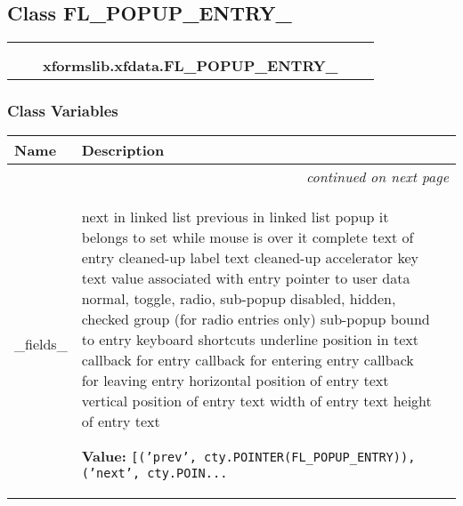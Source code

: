 
\subsection{Class FL\_POPUP\_ENTRY\_}

    \label{xformslib:xfdata:FL_POPUP_ENTRY_}
\begin{tabular}{cccccc}
\multicolumn{2}{r}{\settowidth{\BCL}{ctypes.Structure}\multirow{2}{\BCL}{ctypes.Structure}}
&&
  \\\cline{3-3}
  &&\multicolumn{1}{c|}{}
&&
  \\
&&\multicolumn{2}{l}{\textbf{xformslib.xfdata.FL\_POPUP\_ENTRY\_}}
\end{tabular}



  \subsubsection{Class Variables}

    \vspace{-1cm}
\hspace{\varindent}\begin{longtable}{|p{\varnamewidth}|p{\vardescrwidth}|l}
\cline{1-2}
\cline{1-2} \centering \textbf{Name} & \centering \textbf{Description}& \\
\cline{1-2}
\endhead\cline{1-2}\multicolumn{3}{r}{\small\textit{continued on next page}}\\\endfoot\cline{1-2}
\endlastfoot\raggedright \_\-f\-i\-e\-l\-d\-s\-\_\- & \raggedright next in linked list
previous in linked list
popup it belongs to
set while mouse is over it
complete text of entry
cleaned-up label text
cleaned-up accelerator key text
value associated with entry
pointer to user data
normal, toggle, radio, sub-popup
disabled, hidden, checked
group (for radio entries only)
sub-popup bound to entry
keyboard shortcuts
underline position in text
callback for entry
callback for entering entry
callback for leaving entry
horizontal position of entry text
vertical position of entry text
width of entry text
height of entry text

\textbf{Value:} 
{\tt [('prev', cty.POINTER(FL\_POPUP\_ENTRY)), ('next', cty.POIN\texttt{...}}&\\
\cline{1-2}
\end{longtable}

